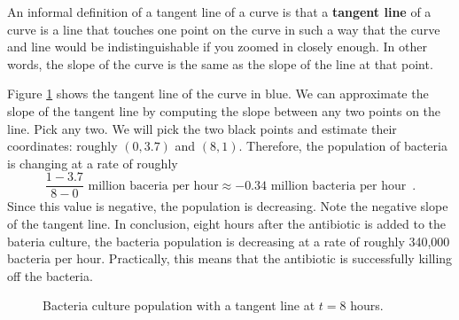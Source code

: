 An informal definition of a tangent line of a curve is that a {\bf tangent line} of a curve is a line that touches one point on the curve in such a way that the curve and line would be indistinguishable if you zoomed in closely enough. In other words, the slope of the curve is the same as the slope of the line at that point.

Figure \ref{fig:2-2-bacteria-tangent} shows the tangent line of the curve in blue. We can approximate the slope of the tangent line by computing the slope between any two points on the line. Pick any two. We will pick the two black points and estimate their coordinates: roughly $(0, 3.7)$ and $(8, 1)$. Therefore, the population of bacteria is changing at a rate of roughly
$$\frac{1-3.7}{8-0} \mbox{ million baceria per hour} \approx -0.34 \mbox{ million bacteria per hour} \enspace .$$
Since this value is negative, the population is decreasing. Note the negative slope of the tangent line. In conclusion, eight hours after the antibiotic is added to the bateria culture, the bacteria population is decreasing at a rate of roughly 340,000 bacteria per hour. Practically, this means that the antibiotic is successfully killing off the bacteria.
\begin{figure}[ht!]
\centering
{}
\caption{Bacteria culture population with a tangent line at $t=8$ hours.}
\label{fig:2-2-bacteria-tangent}
\end{figure}


